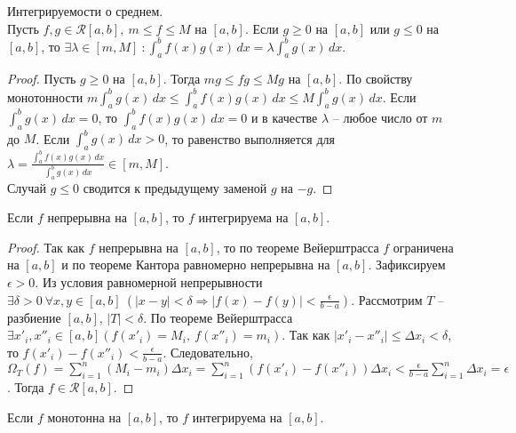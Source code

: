     \begin{theorem}{Интегрируемости о среднем.}\\
        Пусть $f, g \in \mathcal{R}[a, b], \ m \leq f \leq M$ на $[a, b]$.
        Если $g \geq 0$ на $[a, b]$ или $g \leq 0$ на $[a, b]$, то
        $\exists \lambda \in [m, M] \ : \int_a^b f(x)g(x) \,dx = \lambda \int_a^b g(x) \,dx$.
    \end{theorem}
    
    \begin{proof}
        Пусть $g \geq 0$ на $[a, b]$.  Тогда $mg \leq fg \leq Mg$ на $[a, b]$.
        По свойству монотонности $m \int_a^b g(x) \,dx \leq \int_a^b f(x)g(x) \,dx \leq M \int_a^b g(x) \,dx$.
        Если $\int_a^b g(x) \,dx = 0$, то $\int_a^b f(x)g(x) \,dx = 0$ и в качестве $\lambda$ -- любое число от $m$ до $M$.
        Если $\int_a^b g(x) \,dx > 0$, то равенство выполняется для
        \(\lambda = \frac{\int_a^b f(x)g(x) \,dx}{\int_a^b g(x) \,dx} \in [m, M].\)\\
        Случай $g \leq 0$ сводится к предыдущему заменой $g$ на $-g$.
    \end{proof}

    \begin{theorem}
        Если $f$ непрерывна на $[a, b]$, то $f$ интегрируема на $[a, b]$.
    \end{theorem}
    
    \begin{proof}
        Так как $f$ непрерывна на $[a, b]$, то по теореме Вейерштрасса $f$ ограничена на $[a, b]$
        и по теореме Кантора равномерно непрерывна на $[a, b]$.
        Зафиксируем $\epsilon > 0$. Из условия равномерной непрерывности
        $\exists \delta > 0 \ \forall x, y \in [a, b] \ (|x - y| < \delta \Rightarrow |f(x) - f(y)| < \frac{\epsilon}{b-a})$. Рассмотрим $T$ -- разбиение $[a, b]$, $|T| < \delta$. По теореме Вейерштрасса
        $\exists x'_i, x''_i \in [a, b] (f(x'_i) = M_i, \ f(x''_i) = m_i)$.
        Так как $|x'_i - x''_i| \leq \Delta x_i < \delta$, то $f(x'_i) - f(x''_i) < \frac{\epsilon}{b-a}$.
        Следовательно, \(\Omega_T(f) = \sum_{i = 1}^n(M_i - m_i)\Delta x_i = 
        \sum_{i = 1}^n(f(x'_i) - f(x''_i))\Delta x_i < \frac{\epsilon}{b-a}\sum_{i = 1}^n \Delta x_i = \epsilon\).
        Тогда $f \in \mathcal{R}[a, b]$.
    \end{proof}
    
    \begin{theorem}
        Если $f$ монотонна на $[a, b]$, то $f$ интегрируема на $[a, b]$.
    \end{theorem}
    
